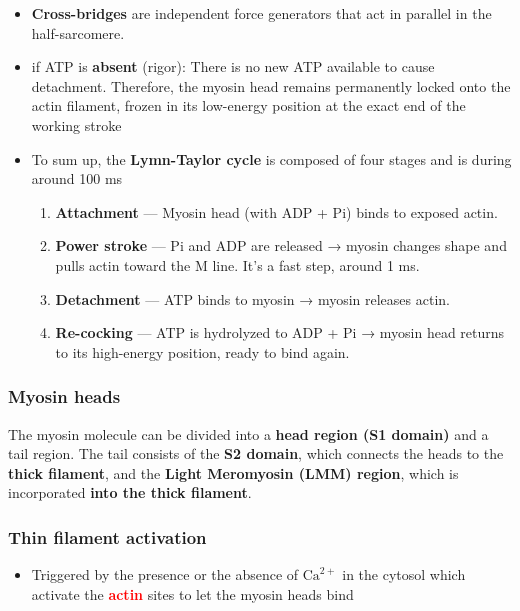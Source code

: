 \documentclass{article}
\begin{document}
\begin{itemize}
    \item \textbf{Cross-bridges} are independent force generators that act in parallel in the half-sarcomere.
    \item if ATP is \textbf{absent} (rigor): There is no new ATP available to cause detachment. Therefore, the myosin head remains permanently locked onto the actin filament, frozen in its low-energy position at the exact end of the working stroke
    \item To sum up, the \textbf{Lymn-Taylor cycle} is composed of four stages and is during around 100  ms 
    \begin{enumerate}[label=(\arabic*)]
        \item \textbf{Attachment} — Myosin head (with ADP + Pi) binds to exposed actin.
        \item \textbf{Power stroke} — Pi and ADP are released → myosin changes shape and pulls actin toward the M line. It's a fast step, around 1 ms.
        \item \textbf{Detachment} — ATP binds to myosin → myosin releases actin.
        \item \textbf{Re-cocking} — ATP is hydrolyzed to ADP + Pi → myosin head returns to its high-energy position, ready to bind again.
    \end{enumerate}
    
\end{itemize}

\subsubsection{Myosin heads}

The myosin molecule can be divided into a \textbf{head region (S1 domain)} and a tail region. The tail consists of the \textbf{S2 domain}, which connects the heads to the \textbf{thick filament}, and the \textbf{Light Meromyosin (LMM) region}, which is incorporated \textbf{into the thick filament}.

\subsubsection{Thin filament activation}
\begin{itemize}
    \item Triggered by the presence or the absence of $\text{Ca}^{2+}$ in the cytosol which activate the \textbf{\textcolor{red}{actin}} sites to let the myosin heads bind
\end{itemize}
\end{document}
